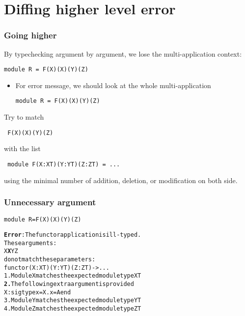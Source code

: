 \documentclass[a4paper,11pt]{beamer}
\begin{document}
\section{Diffing higher level error}


\begin{frame}[fragile]\frametitle{Going higher}

  By typechecking argument by argument, we lose the multi-application
  context:
\begin{verbatim}
module R = F(X)(X)(Y)(Z)
\end{verbatim}

  \begin{itemize}
      \item For error message, we should look at the whole multi-application
\begin{verbatim}
module R = F(X)(X)(Y)(Z)
\end{verbatim}

  \end{itemize}
Try to match
\begin{verbatim}
 F(X)(X)(Y)(Z)
\end{verbatim}
with the list
\begin{verbatim}
 module F(X:XT)(Y:YT)(Z:ZT) = ...
\end{verbatim}

using the minimal number of addition, deletion, or modification on both side.

\end{frame}


\begin{frame}[fragile]\frametitle{Unnecessary argument}
\begin{verbatim}
module R=F(X)(X)(Y)(Z)
\end{verbatim}
\begin{alltt}
{\bfseries{}\color{red}{}Error}: The functor application is ill-typed.
       These arguments:
         {\color{green}{}X} {\color{red}{}\bfseries{}X} {\color{green}{}Y} {\color{green}{}Z}
       do not match these parameters:
         functor {\color{green}{}(X : XT)} {\color{red}{}\bfseries{}} {\color{green}{}(Y : YT)} {\color{green}{}(Z : ZT)} -> ...
  {\color{green}{}1.} Module X matches the expected module type XT
  {\color{red}{}\bfseries{}2.} The following extra argument is provided
     X : sig type x = X.x = A end
  {\color{green}{}3.} Module Y matches the expected module type YT
  {\color{green}{}4.} Module Z matches the expected module type ZT
\end{alltt}
\end{frame}
\end{document}
